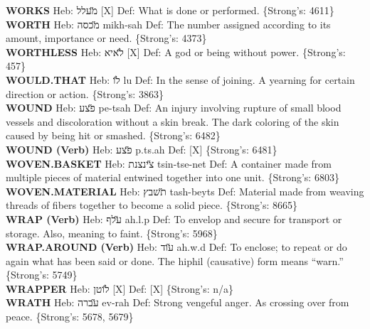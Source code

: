{\textbf{WORKS} Heb: {\large\H מעלל} {[}X{]} Def: What is done or performed. \{Strong's: 4611\}\hfill{}\\

\textbf{WORTH} Heb: {\large\H מכסה} mikh-sah Def: The number assigned according to its amount, importance or need. \{Strong's: 4373\}\hfill{}\\

\textbf{WORTHLESS} Heb: {\large\H לאיא} {[}X{]} Def: A god or being without power. \{Strong's: 457\}\hfill{}\\

\textbf{WOULD.THAT} Heb: {\large\H לו} lu Def: In the sense of joining. A yearning for certain direction or action. \{Strong's: 3863\}\hfill{}\\

\textbf{WOUND} Heb: {\large\H פצע} pe-tsah Def: An injury involving rupture of small blood vessels and discoloration without a skin break. The dark coloring of the skin caused by being hit or smashed. \{Strong's: 6482\}\hfill{}\\

\textbf{WOUND (Verb)} Heb: {\large\H פצע} p.ts.ah Def: {[}X{]} \{Strong's: 6481\}\hfill{}\\

\textbf{WOVEN.BASKET} Heb: {\large\H צינצנת} tsin-tse-net Def: A container made from multiple pieces of material entwined together into one unit. \{Strong's: 6803\}\hfill{}\\

\textbf{WOVEN.MATERIAL} Heb: {\large\H תשבץ} tash-beyts Def: Material made from weaving threads of fibers together to become a solid piece. \{Strong's: 8665\}\hfill{}\\

\textbf{WRAP (Verb)} Heb: {\large\H עלף} ah.l.p Def: To envelop and secure for transport or storage. Also, meaning to faint. \{Strong's: 5968\}\hfill{}\\

\textbf{WRAP.AROUND (Verb)} Heb: {\large\H עוד} ah.w.d Def: To enclose; to repeat or do again what has been said or done. The hiphil (causative) form means ``warn.'' \{Strong's: 5749\}\hfill{}\\

\textbf{WRAPPER} Heb: {\large\H לוטן} {[}X{]} Def: {[}X{]} \{Strong's: n/a\}\hfill{}\\

\textbf{WRATH} Heb: {\large\H עברה} ev-rah Def: Strong vengeful anger. As crossing over from peace. \{Strong's: 5678, 5679\}\hfill{}\\

}
